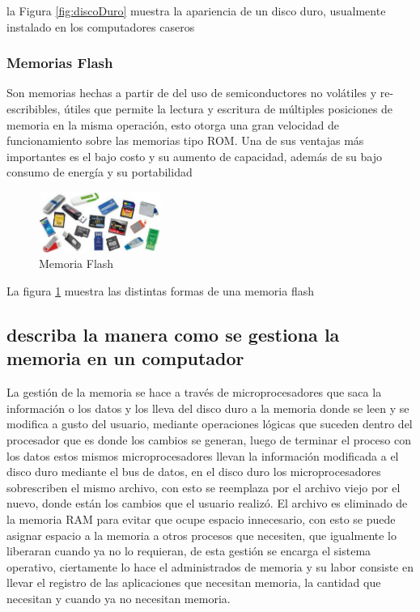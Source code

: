 \documentclass{article}
\begin{document}
        la Figura \ref{fig:discoDuro} muestra la apariencia de un disco duro, usualmente instalado en los computadores caseros 
        
        \subsubsection{Memorias Flash}
        Son memorias hechas a partir de del uso de semiconductores no volátiles y re-escribibles, útiles que permite la lectura y escritura de múltiples posiciones de memoria en la misma operación, esto otorga una gran velocidad de funcionamiento sobre las memorias tipo ROM. Una de sus ventajas más importantes es el bajo costo y su aumento de capacidad, además de su bajo consumo de energía y su portabilidad 
        
        \begin{figure}[h]
        \includegraphics[width=4cm]{flash.jpg}
        \centering
        \caption{Memoria Flash}
        \label{fig:flash}
        \end{figure}
        
        La figura \ref{fig:flash} muestra las distintas formas de una memoria flash
    
    \subsection{describa la manera como se gestiona la memoria en un computador}
    La gestión de la memoria se hace a través de microprocesadores que saca la información o los datos y los lleva del disco duro a la memoria donde se  leen y se modifica a gusto del usuario, mediante operaciones lógicas que suceden dentro del procesador que es donde los cambios se generan, luego de terminar el proceso con los datos estos mismos microprocesadores llevan la información modificada a el disco duro mediante el bus de datos, en el disco duro los microprocesadores sobrescriben el mismo archivo, con esto se reemplaza por el archivo viejo por el nuevo, donde están los cambios que el usuario realizó. 
    El archivo es eliminado de la memoria RAM para evitar que ocupe espacio innecesario, con esto se puede asignar espacio a la memoria a otros procesos que necesiten, que igualmente lo liberaran cuando ya no lo requieran, de esta gestión se encarga el sistema operativo, ciertamente lo hace el administrados de memoria y su labor consiste en llevar el registro de las aplicaciones que necesitan memoria, la cantidad que necesitan y cuando ya no necesitan memoria.\cite{gestion}
 
\end{document}
